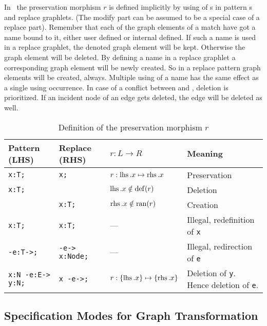 In \GrG\ the preservation morphism $r$ is defined implicitly by using of s in pattern s and replace graphlets. (The modify part can be assumed to be a special case of a replace part).
Remember that each of the graph elements of a match have got a name bound to it, either user defined or internal defined. If such a name is used in a replace graphlet, the denoted graph element will be kept. 
Otherwise the graph element will be deleted.
By defining a name in a replace graphlet a corresponding graph element will be newly created.
So in a replace pattern  graph elements will be created, always.
Multiple using of a name has the same effect as a single using occurrence.
In case of a conflict between  and , deletion is prioritized. 
If an incident node of an edge gets deleted, the edge will be deleted as well.

\begin{table}[htbp]
\centering
\begin{tabularx}{\linewidth}{lllX}
  \textbf{Pattern (LHS)} & \textbf{Replace (RHS)} & \textbf{$r: L \longrightarrow R$} & \textbf{Meaning} \\ \hline 
  \texttt{x:T;} & \texttt{x;}                 & $r:\operatorname{lhs}.x \mapsto \operatorname{rhs}.x$ & Preservation \\
  \texttt{x:T;} & \texttt{}                   & $\operatorname{lhs}.x \notin \operatorname{def}(r)$    & Deletion \\
  \texttt{} & \texttt{x:T;}                   & $\operatorname{rhs}.x \notin \operatorname{ran}(r)$    & Creation \\
  \texttt{x:T;} & \texttt{x:T;}               & --- & Illegal, redefinition of \texttt{x} \\
  \texttt{-e:T->;} & \texttt{-e-> x:Node;}    & --- & Illegal, redirection of  \texttt{e} \\
  \texttt{x:N -e:E-> y:N;} & \texttt{x -e->;} & $r:\{\operatorname{lhs}.x\} \mapsto \{\operatorname{rhs}.x\}$ & Deletion of \texttt{y}. Hence del\-etion of \texttt{e}. \\
\end{tabularx}
\caption{Definition of the preservation morphism $r$}
\label{rule:impldefinition}
\end{table}

\subsection{Specification Modes for Graph Transformation}

